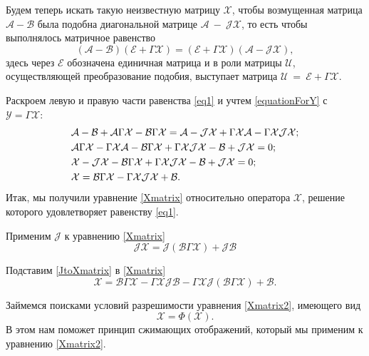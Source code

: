 Будем теперь искать такую неизвестную матрицу $\mathcal{X}$, чтобы возмущенная матрица $\mathcal{A}-\mathcal{B}$ была подобна диагональной матрице $\mathcal{A}~-~\mathcal{J}\mathcal{X}$, то есть чтобы выполнялось матричное равенство
\begin{equation}\label{eq1}
(\mathcal{A}-\mathcal{B})(\mathcal{E}+\Gamma\mathcal{X})=(\mathcal{E}+\Gamma\mathcal{X})(\mathcal{A-JX}),
\end{equation}
здесь через $\mathcal{E}$ обозначена единичная матрица и в роли матрицы $\mathcal{U}$, осуществляющей преобразование подобия, выступает матрица $\mathcal{U}~=~\mathcal{E}+\Gamma\mathcal{X}$.

Раскроем левую и правую части равенства \eqref{eq1} и учтем \eqref{equationForY} с $\mathcal{Y}=\Gamma\mathcal{X}$:
\begin{align}
&\mathcal{A-B}+\mathcal{A}\Gamma\mathcal{X}-\mathcal{B}\Gamma\mathcal{X}=\mathcal{A-JX}+\Gamma\mathcal{X}\mathcal{A}-\Gamma\mathcal{XJX};\\ \notag
&\mathcal{A}\Gamma\mathcal{X}-\Gamma\mathcal{XA}-\mathcal{B}\Gamma\mathcal{X}+\Gamma\mathcal{XJX}-\mathcal{B}+\mathcal{JX}=0;\\ \notag
&\mathcal{X-JX}-\mathcal{B}\Gamma\mathcal{X}+\Gamma\mathcal{XJX}-\mathcal{B}+\mathcal{JX}=0;\\ \notag
&\mathcal{X}=\mathcal{B}\Gamma\mathcal{X}-\Gamma\mathcal{XJX}+\mathcal{B}. \label{Xmatrix}
\end{align}
Итак, мы получили уравнение \eqref{Xmatrix} относительно оператора $\mathcal{X}$, решение которого удовлетворяет равенству \eqref{eq1}.

Применим $\mathcal{J}$ к уравнению \eqref{Xmatrix}
\begin{equation}\label{JtoXmatrix}
\mathcal{JX}=\mathcal{J}(\mathcal{B}\Gamma\mathcal{X})+\mathcal{JB}
\end{equation}

Подставим \eqref{JtoXmatrix} в \eqref{Xmatrix}
\begin{equation}\label{Xmatrix2}
\mathcal{X}=\mathcal{B}\Gamma\mathcal{X}-\Gamma\mathcal{XJB}-\Gamma\mathcal{XJ}(\mathcal{B}\Gamma\mathcal{X})+\mathcal{B}.
\end{equation}

Займемся поисками условий разрешимости уравнения \eqref{Xmatrix2}, имеющего вид
\begin{equation}\label{Xmatrix3}
\mathcal{X}=\Phi(\mathcal{X}).
\end{equation}
В этом нам поможет принцип сжимающих отображений, который мы применим к уравнению \eqref{Xmatrix2}.


